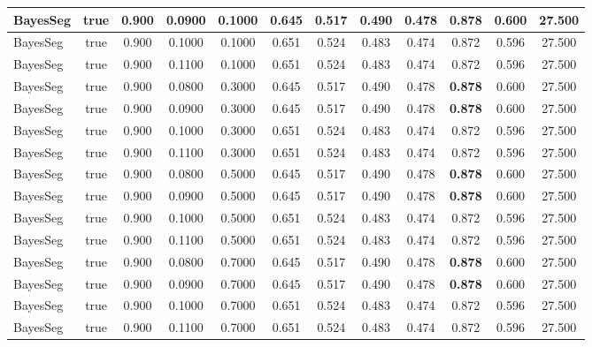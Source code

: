 \documentclass{article}
\begin{document}
\begin{longtable}[c]{|l|c|c|c|c|c|c|c|c|c|c|c|}
 BayesSeg & true & 0.900 & 0.0900 & 0.1000 & 0.645 & 0.517 & 0.490 & 0.478 & \cellcolor{gray!20} \textbf{0.878} & 0.600 & 27.500  \\ \hline 
 BayesSeg & true & 0.900 & 0.1000 & 0.1000 & 0.651 & 0.524 & 0.483 & 0.474 & 0.872 & 0.596 & 27.500  \\ \hline 
 BayesSeg & true & 0.900 & 0.1100 & 0.1000 & 0.651 & 0.524 & 0.483 & 0.474 & 0.872 & 0.596 & 27.500  \\ \hline 
 BayesSeg & true & 0.900 & 0.0800 & 0.3000 & 0.645 & 0.517 & 0.490 & 0.478 & \cellcolor{gray!20} \textbf{0.878} & 0.600 & 27.500  \\ \hline 
 BayesSeg & true & 0.900 & 0.0900 & 0.3000 & 0.645 & 0.517 & 0.490 & 0.478 & \cellcolor{gray!20} \textbf{0.878} & 0.600 & 27.500  \\ \hline 
 BayesSeg & true & 0.900 & 0.1000 & 0.3000 & 0.651 & 0.524 & 0.483 & 0.474 & 0.872 & 0.596 & 27.500  \\ \hline 
 BayesSeg & true & 0.900 & 0.1100 & 0.3000 & 0.651 & 0.524 & 0.483 & 0.474 & 0.872 & 0.596 & 27.500  \\ \hline 
 BayesSeg & true & 0.900 & 0.0800 & 0.5000 & 0.645 & 0.517 & 0.490 & 0.478 & \cellcolor{gray!20} \textbf{0.878} & 0.600 & 27.500  \\ \hline 
 BayesSeg & true & 0.900 & 0.0900 & 0.5000 & 0.645 & 0.517 & 0.490 & 0.478 & \cellcolor{gray!20} \textbf{0.878} & 0.600 & 27.500  \\ \hline 
 BayesSeg & true & 0.900 & 0.1000 & 0.5000 & 0.651 & 0.524 & 0.483 & 0.474 & 0.872 & 0.596 & 27.500  \\ \hline 
 BayesSeg & true & 0.900 & 0.1100 & 0.5000 & 0.651 & 0.524 & 0.483 & 0.474 & 0.872 & 0.596 & 27.500  \\ \hline 
 BayesSeg & true & 0.900 & 0.0800 & 0.7000 & 0.645 & 0.517 & 0.490 & 0.478 & \cellcolor{gray!20} \textbf{0.878} & 0.600 & 27.500  \\ \hline 
 BayesSeg & true & 0.900 & 0.0900 & 0.7000 & 0.645 & 0.517 & 0.490 & 0.478 & \cellcolor{gray!20} \textbf{0.878} & 0.600 & 27.500  \\ \hline 
 BayesSeg & true & 0.900 & 0.1000 & 0.7000 & 0.651 & 0.524 & 0.483 & 0.474 & 0.872 & 0.596 & 27.500  \\ \hline 
 BayesSeg & true & 0.900 & 0.1100 & 0.7000 & 0.651 & 0.524 & 0.483 & 0.474 & 0.872 & 0.596 & 27.500  \\ \hline 
 \end{longtable} 
\newpage
\end{document}
